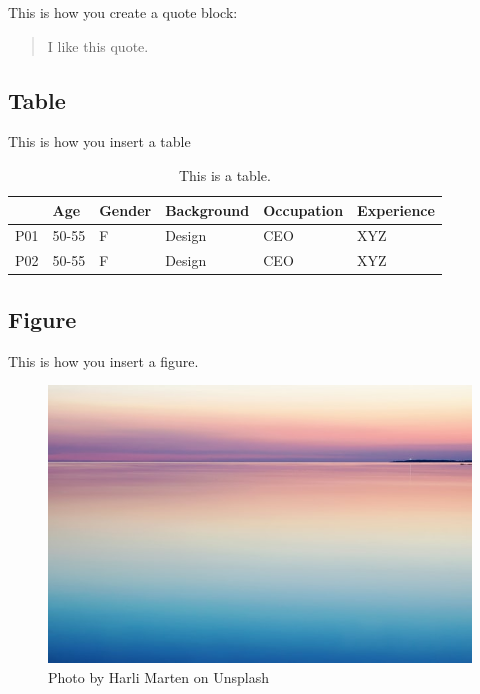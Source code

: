 This is how you create a quote block:

\begin{quote}
    I like this quote.
\end{quote}

\subsection{Table}

This is how you insert a table
\begin{table}
    \caption{This is a table.}
    \label{tab:participant_table}
    \begin{tabular}{|p{0.7cm}|p{1.2cm}|p{1.5cm}|p{3.3cm}|p{4.3cm}|p{1.9cm}|}
      \toprule
       & Age & Gender & Background & Occupation & Experience\\
      \midrule
      P01 & 50-55 & F & Design & CEO & XYZ\\
      P02 & 50-55 & F & Design & CEO & XYZ\\
      \bottomrule
    \end{tabular}
  \end{table}


\subsection{Figure}

This is how you insert a figure.
\begin{figure}[h]
    \centering
    \includegraphics[width= \linewidth]{sources/introduction/images/harli-marten-n7a2OJDSZns-unsplash.jpg}
    \caption{Photo by Harli Marten on Unsplash}
    \label{fig:my_figure_label}
  \end{figure}

